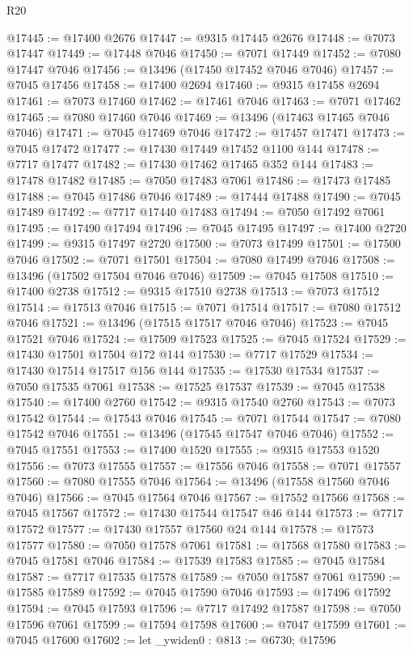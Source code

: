 \begin{lexlean}{R20}
\begin{coremodule}
{@17445 := @17400 @2676
@17447 := @9315 @17445 @2676
@17448 := @7073 @17447
@17449 := @17448 @7046
@17450 := @7071 @17449
@17452 := @7080 @17447 @7046
@17456 := @13496 (@17450 @17452 @7046 @7046)
@17457 := @7045 @17456
@17458 := @17400 @2694
@17460 := @9315 @17458 @2694
@17461 := @7073 @17460
@17462 := @17461 @7046
@17463 := @7071 @17462
@17465 := @7080 @17460 @7046
@17469 := @13496 (@17463 @17465 @7046 @7046)
@17471 := @7045 @17469 @7046
@17472 := @17457 @17471
@17473 := @7045 @17472
@17477 := @17430 @17449 @17452 @1100 @144
@17478 := @7717 @17477
@17482 := @17430 @17462 @17465 @352 @144
@17483 := @17478 @17482
@17485 := @7050 @17483 @7061
@17486 := @17473 @17485
@17488 := @7045 @17486 @7046
@17489 := @17444 @17488
@17490 := @7045 @17489
@17492 := @7717 @17440 @17483
@17494 := @7050 @17492 @7061
@17495 := @17490 @17494
@17496 := @7045 @17495
@17497 := @17400 @2720
@17499 := @9315 @17497 @2720
@17500 := @7073 @17499
@17501 := @17500 @7046
@17502 := @7071 @17501
@17504 := @7080 @17499 @7046
@17508 := @13496 (@17502 @17504 @7046 @7046)
@17509 := @7045 @17508
@17510 := @17400 @2738
@17512 := @9315 @17510 @2738
@17513 := @7073 @17512
@17514 := @17513 @7046
@17515 := @7071 @17514
@17517 := @7080 @17512 @7046
@17521 := @13496 (@17515 @17517 @7046 @7046)
@17523 := @7045 @17521 @7046
@17524 := @17509 @17523
@17525 := @7045 @17524
@17529 := @17430 @17501 @17504 @172 @144
@17530 := @7717 @17529
@17534 := @17430 @17514 @17517 @156 @144
@17535 := @17530 @17534
@17537 := @7050 @17535 @7061
@17538 := @17525 @17537
@17539 := @7045 @17538
@17540 := @17400 @2760
@17542 := @9315 @17540 @2760
@17543 := @7073 @17542
@17544 := @17543 @7046
@17545 := @7071 @17544
@17547 := @7080 @17542 @7046
@17551 := @13496 (@17545 @17547 @7046 @7046)
@17552 := @7045 @17551
@17553 := @17400 @1520
@17555 := @9315 @17553 @1520
@17556 := @7073 @17555
@17557 := @17556 @7046
@17558 := @7071 @17557
@17560 := @7080 @17555 @7046
@17564 := @13496 (@17558 @17560 @7046 @7046)
@17566 := @7045 @17564 @7046
@17567 := @17552 @17566
@17568 := @7045 @17567
@17572 := @17430 @17544 @17547 @46 @144
@17573 := @7717 @17572
@17577 := @17430 @17557 @17560 @24 @144
@17578 := @17573 @17577
@17580 := @7050 @17578 @7061
@17581 := @17568 @17580
@17583 := @7045 @17581 @7046
@17584 := @17539 @17583
@17585 := @7045 @17584
@17587 := @7717 @17535 @17578
@17589 := @7050 @17587 @7061
@17590 := @17585 @17589
@17592 := @7045 @17590 @7046
@17593 := @17496 @17592
@17594 := @7045 @17593
@17596 := @7717 @17492 @17587
@17598 := @7050 @17596 @7061
@17599 := @17594 @17598
@17600 := @7047 @17599
@17601 := @7045 @17600
@17602 := let _ywiden0 : @813 := @6730; @17596
}
\end{coremodule}
\end{lexlean}
